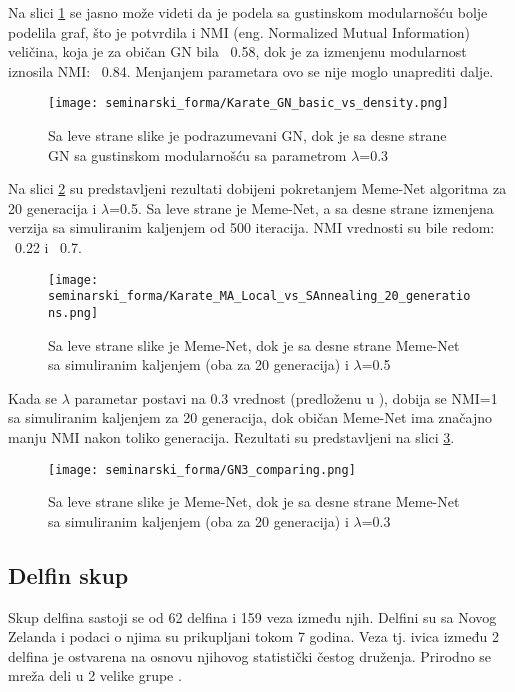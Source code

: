 \documentclass[a4paper]{article}
\begin{document}
Na slici \ref{fig:GN1} se jasno može videti da je podela sa gustinskom modularnošću bolje podelila graf, što je potvrdila i NMI (eng. Normalized Mutual Information) veličina, koja je za običan GN bila ~0.58, dok je za izmenjenu modularnost iznosila NMI: ~0.84. Menjanjem parametara ovo se nije moglo unaprediti dalje.
\begin{figure}[h!]
\centering
\captionsetup{justification=centering,margin=1cm}
\begin{center}
\texttt{[image: seminarski\_forma/Karate\_GN\_basic\_vs\_density.png]}
\end{center}
\caption{Sa leve strane slike je podrazumevani GN, dok je sa desne strane GN sa gustinskom modularnošću sa parametrom $\lambda$=0.3}
\label{fig:GN1}
\end{figure}
Na slici \ref{fig:Meme1} su predstavljeni rezultati dobijeni pokretanjem Meme-Net algoritma za 20 generacija i $\lambda$=0.5. Sa leve strane je Meme-Net, a sa desne strane izmenjena verzija sa simuliranim kaljenjem od 500 iteracija. NMI vrednosti su bile redom: ~0.22 i ~0.7.
\begin{figure}[h!]
\centering
\captionsetup{justification=centering,margin=1cm}
\begin{center}
\texttt{[image: seminarski\_forma/Karate\_MA\_Local\_vs\_SAnnealing\_20\_generations.png]}
\end{center}
\caption{Sa leve strane slike je Meme-Net, dok je sa desne strane Meme-Net sa simuliranim kaljenjem (oba za 20 generacija) i $\lambda$=0.5}
\label{fig:Meme1}
\end{figure}
Kada se $\lambda$ parametar postavi na 0.3 vrednost (predloženu u \cite{gong2011memetic}), dobija se NMI=1 sa simuliranim kaljenjem za 20 generacija, dok običan Meme-Net ima značajno manju NMI nakon toliko generacija. Rezultati su predstavljeni na slici \ref{fig:Meme2}.
\begin{figure}[h!]
\centering
\captionsetup{justification=centering,margin=1cm}
\begin{center}
\texttt{[image: seminarski\_forma/GN3\_comparing.png]}
\end{center}
\caption{Sa leve strane slike je Meme-Net, dok je sa desne strane Meme-Net sa simuliranim kaljenjem (oba za 20 generacija) i $\lambda$=0.3}
\label{fig:Meme2}
\end{figure}

\subsection{Delfin skup}
Skup delfina sastoji se od 62 delfina i 159 veza između njih. Delfini su sa Novog Zelanda i podaci o njima su prikupljani tokom 7 godina. Veza tj. ivica između 2 delfina je ostvarena na osnovu njihovog statistički čestog druženja. Prirodno se mreža deli u 2 velike grupe \cite{gong2011memetic}.
\end{document}
